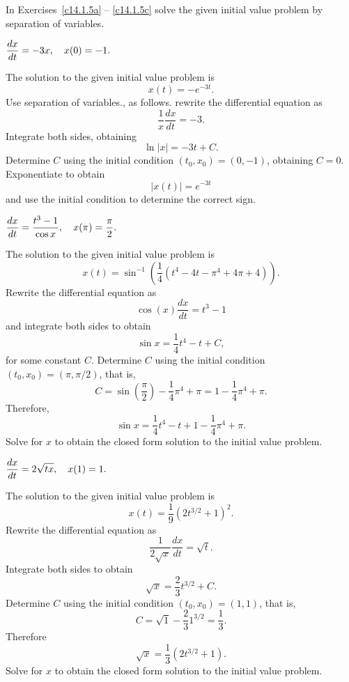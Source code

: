 \documentclass{ximera}
\begin{document}
\noindent In Exercises~\ref{c14.1.5a} -- \ref{c14.1.5c} solve the given 
initial value problem by separation of variables. 
\begin{exercise}  \label{c14.1.5a}
$\displaystyle \frac{dx}{dt} = -3x,\quad x(0)=-1.$

\begin{solution}
\ans The solution to the given initial value problem is
\[
x(t) = -e^{-3t}.
\]
\soln Use separation of variables., as follows.  rewrite the differential 
equation as
\[
\frac{1}{x}\frac{dx}{dt} = -3.
\]
Integrate both sides, obtaining 
\[
\ln|x| = -3t + C.
\]
Determine $C$ using the initial condition $(t_0,x_0)=(0,-1)$, obtaining
$C=0$.  Exponentiate to obtain 
\[
|x(t)| = e^{-3t}
\]
and use the initial condition to determine the correct sign.

\end{solution}
\end{exercise}
\begin{exercise}  \label{c14.1.5b}
$\displaystyle \frac{dx}{dt} = \frac{t^3-1}{\cos x},
\quad x(\pi)=\frac{\pi}{2}.$

\begin{solution}
\ans The solution to the given initial value problem is
\[
x(t) = \sin^{-1}\left(\frac{1}{4}(t^4 - 4t - \pi^4 + 4\pi + 4)\right).
\]
\soln Rewrite the differential equation as
\[
\cos(x) \frac{dx}{dt} = t^3 - 1
\]
and integrate both sides to obtain
\[
\sin x = \frac{1}{4}t^4 - t + C,
\]
for some constant $C$.  Determine $C$ using the initial condition 
$(t_0,x_0)=(\pi,\pi/2)$, that is,
\[
C = \sin\left(\frac{\pi}{2}\right) - \frac{1}{4}\pi^4 + \pi 
= 1 - \frac{1}{4}\pi^4 + \pi.
\]
Therefore,
\[
\sin x = \frac{1}{4}t^4 - t + 1 - \frac{1}{4}\pi^4 + \pi.
\]
Solve for $x$ to obtain the closed form solution to the initial value problem.


\end{solution}
\end{exercise}
\begin{exercise}  \label{c14.1.5c}
$\displaystyle \frac{dx}{dt} = 2\sqrt{tx},\quad x(1)=1.$

\begin{solution}
\ans The solution to the given initial value problem is
\[
x(t) = \frac{1}{9}(2t^{3/2} + 1)^2.
\]
\soln Rewrite the differential equation as 
\[
\frac{1}{2\sqrt{x}}\frac{dx}{dt} = \sqrt{t}.
\]
Integrate both sides to obtain
\[
\sqrt{x} = \frac{2}{3}t^{3/2} + C.
\]
Determine $C$ using the initial condition $(t_0,x_0)=(1,1)$, that is,
\[
C = \sqrt{1} - \frac{2}{3}1^{3/2} = \frac{1}{3}.
\]
Therefore
\[
\sqrt{x} = \frac{1}{3}(2t^{3/2} + 1).
\]
Solve for $x$ to obtain the closed form solution to the initial value problem.

\end{solution}
\end{exercise}
\end{document}
